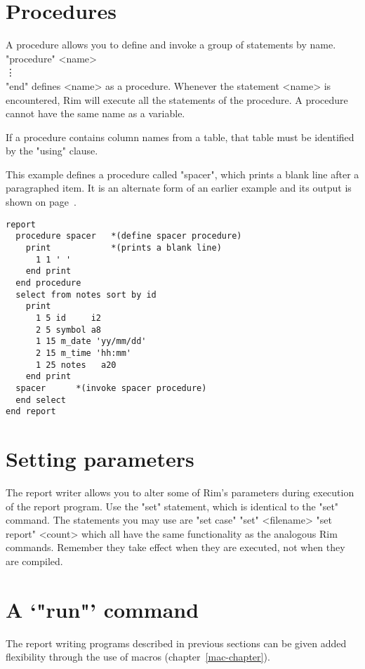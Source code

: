 \section{Procedures}
%
A procedure allows you to define and
invoke a group of statements by name.
\<"procedure" <name> \\
 \qquad\vdots\\
 "end" \>
defines <name> as a procedure.  Whenever the statement
\<<name>\>
is encountered, Rim will execute all the statements of the
procedure.
A procedure cannot have the same name as a variable.
 
If a procedure contains column names from a table,
that table must be identified by the "using" clause.
 
 
\demobreak
This example defines a procedure called "spacer", which prints a blank
line after a paragraphed item.
It is an alternate form of an earlier example and
its output is shown on
page~\pageref{para-demo}.
\demobreak
\begin{verbatim}
report
  procedure spacer   *(define spacer procedure)
    print            *(prints a blank line)
      1 1 ' '
    end print
  end procedure
  select from notes sort by id
    print
      1 5 id     i2
      2 5 symbol a8
      1 15 m_date 'yy/mm/dd'
      2 15 m_time 'hh:mm'
      1 25 notes   a20
    end print
  spacer      *(invoke spacer procedure)
  end select
end report
\end{verbatim}
 
 
 
 
\section{Setting parameters}
%
The report writer allows you to alter some of Rim's parameters
during execution of the report program.
Use the "set" statement, which is identical to the
"set" command.  The statements you may use are
\<"set case" \>
\<"set"  <filename>\>
\<"set report"  <count>\>
which all have the same functionality as the analogous Rim commands.
Remember they take effect when they are executed, not when
they are compiled.
 
 
\section{A `"run"' command}
\label{run-mac}
The report writing programs described in previous sections
can be given added flexibility through the use of macros
(chapter~\ref{mac-chapter}).
 
